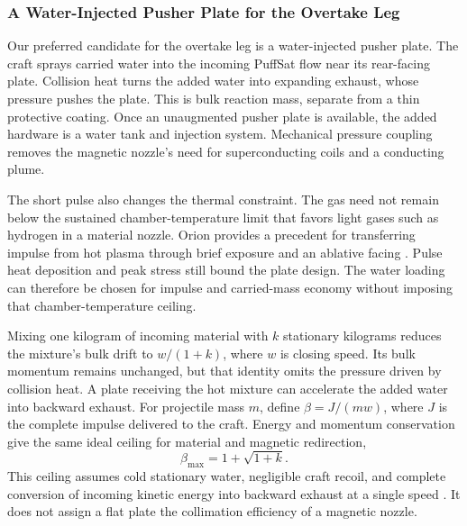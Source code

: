\documentclass{article}
\begin{document}
\subsubsection{A Water-Injected Pusher Plate for the Overtake Leg}
\label{sec:water_injected_overtake}

Our preferred candidate for the overtake leg is a water-injected pusher plate. The craft sprays carried water into the incoming PuffSat flow near its rear-facing plate. Collision heat turns the added water into expanding exhaust, whose pressure pushes the plate. This is bulk reaction mass, separate from a thin protective coating. Once an unaugmented pusher plate is available, the added hardware is a water tank and injection system. Mechanical pressure coupling removes the magnetic nozzle's need for superconducting coils and a conducting plume.

The short pulse also changes the thermal constraint. The gas need not remain below the sustained chamber-temperature limit that favors light gases such as hydrogen in a material nozzle. Orion provides a precedent for transferring impulse from hot plasma through brief exposure and an ablative facing \cite{projorion}. Pulse heat deposition and peak stress still bound the plate design. The water loading can therefore be chosen for impulse and carried-mass economy without imposing that chamber-temperature ceiling.

Mixing one kilogram of incoming material with $k$ stationary kilograms reduces the mixture's bulk drift to $w/(1+k)$, where $w$ is closing speed. Its bulk momentum remains unchanged, but that identity omits the pressure driven by collision heat. A plate receiving the hot mixture can accelerate the added water into backward exhaust. For projectile mass $m$, define $\beta=J/(mw)$, where $J$ is the complete impulse delivered to the craft. Energy and momentum conservation give the same ideal ceiling for material and magnetic redirection,
\begin{equation}
    \beta_{\max}=1+\sqrt{1+k}.
    \label{eq:water_plate_ceiling}
\end{equation}
This ceiling assumes cold stationary water, negligible craft recoil, and complete conversion of incoming kinetic energy into backward exhaust at a single speed \cite{Katz_water_injected_plate_2026}. It does not assign a flat plate the collimation efficiency of a magnetic nozzle.
\end{document}
